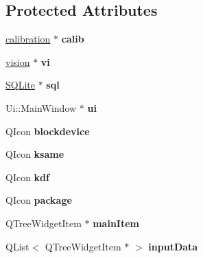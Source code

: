 \subsection*{Protected Attributes}
\begin{DoxyCompactItemize}
\item 
\hypertarget{classMainWindow_ae41ab8a2caab2b5b1a1432ce15eb0e51}{\hyperlink{classcalibration}{calibration} $\ast$ {\bfseries calib}}\label{classMainWindow_ae41ab8a2caab2b5b1a1432ce15eb0e51}

\item 
\hypertarget{classMainWindow_aed5906811bbf1191aa952deb4279e36f}{\hyperlink{classvision}{vision} $\ast$ {\bfseries vi}}\label{classMainWindow_aed5906811bbf1191aa952deb4279e36f}

\item 
\hypertarget{classMainWindow_a27a47dcf3589dd010ce7803cb3b2ff85}{\hyperlink{classSQLite}{S\-Q\-Lite} $\ast$ {\bfseries sql}}\label{classMainWindow_a27a47dcf3589dd010ce7803cb3b2ff85}

\item 
\hypertarget{classMainWindow_a35466a70ed47252a0191168126a352a5}{Ui\-::\-Main\-Window $\ast$ {\bfseries ui}}\label{classMainWindow_a35466a70ed47252a0191168126a352a5}

\item 
\hypertarget{classMainWindow_add3756176df4e7230246c550d9b6e2db}{Q\-Icon {\bfseries blockdevice}}\label{classMainWindow_add3756176df4e7230246c550d9b6e2db}

\item 
\hypertarget{classMainWindow_ac1beb6db1d37a2a6c3d66688aefd9a66}{Q\-Icon {\bfseries ksame}}\label{classMainWindow_ac1beb6db1d37a2a6c3d66688aefd9a66}

\item 
\hypertarget{classMainWindow_a9d4567d65912ab7578d00827129c4755}{Q\-Icon {\bfseries kdf}}\label{classMainWindow_a9d4567d65912ab7578d00827129c4755}

\item 
\hypertarget{classMainWindow_a211b3162d03a5c229ac006150286429e}{Q\-Icon {\bfseries package}}\label{classMainWindow_a211b3162d03a5c229ac006150286429e}

\item 
\hypertarget{classMainWindow_a4a0290f0cbe44f14933b0903728d420c}{Q\-Tree\-Widget\-Item $\ast$ {\bfseries main\-Item}}\label{classMainWindow_a4a0290f0cbe44f14933b0903728d420c}

\item 
\hypertarget{classMainWindow_ab00172798ad65e4b60d1e14bc681a50d}{Q\-List$<$ Q\-Tree\-Widget\-Item $\ast$ $>$ {\bfseries input\-Data}}\label{classMainWindow_ab00172798ad65e4b60d1e14bc681a50d}


\end{DoxyCompactItemize}
